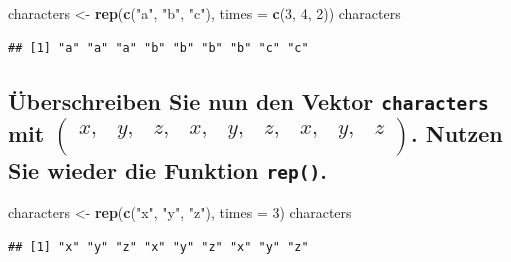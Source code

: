 \documentclass[12pt,a4paper]{article}
\newenvironment{Shaded}{\begin{snugshade}}{\end{snugshade}}
\newcommand{\AttributeTok}[1]{\textcolor[rgb]{0.13,0.29,0.53}{#1}}
\newcommand{\DecValTok}[1]{\textcolor[rgb]{0.00,0.00,0.81}{#1}}
\newcommand{\FunctionTok}[1]{\textcolor[rgb]{0.13,0.29,0.53}{\textbf{#1}}}
\newcommand{\NormalTok}[1]{#1}
\newcommand{\OtherTok}[1]{\textcolor[rgb]{0.56,0.35,0.01}{#1}}
\newcommand{\StringTok}[1]{\textcolor[rgb]{0.31,0.60,0.02}{#1}}
\begin{document}
\begin{Shaded}
\begin{Highlighting}[]
\NormalTok{    characters }\OtherTok{\textless{}{-}} \FunctionTok{rep}\NormalTok{(}\FunctionTok{c}\NormalTok{(}\StringTok{"a"}\NormalTok{, }\StringTok{"b"}\NormalTok{, }\StringTok{"c"}\NormalTok{), }\AttributeTok{times =} \FunctionTok{c}\NormalTok{(}\DecValTok{3}\NormalTok{, }\DecValTok{4}\NormalTok{, }\DecValTok{2}\NormalTok{))}
\NormalTok{    characters}
\end{Highlighting}
\end{Shaded}

\begin{verbatim}
## [1] "a" "a" "a" "b" "b" "b" "b" "c" "c"
\end{verbatim}

\vspace{0.5cm}

\subsection{\texorpdfstring{Überschreiben Sie nun den Vektor
\texttt{characters} mit
\linebreak  \(\begin{pmatrix} x, & y, & z, & x, & y, & z, & x, & y, & z \\ \end{pmatrix}\).
Nutzen Sie wieder die Funktion
\texttt{rep()}.}{Überschreiben Sie nun den Vektor  mit \textbackslash begin\{pmatrix\} x, \& y, \& z, \& x, \& y, \& z, \& x, \& y, \& z \textbackslash\textbackslash{} \textbackslash end\{pmatrix\}. Nutzen Sie wieder die Funktion .}}\label{uxfcberschreiben-sie-nun-den-vektor-mit-beginpmatrix-x-y-z-x-y-z-x-y-z-endpmatrix.-nutzen-sie-wieder-die-funktion-.}

\begin{Shaded}
\begin{Highlighting}[]
\NormalTok{    characters }\OtherTok{\textless{}{-}} \FunctionTok{rep}\NormalTok{(}\FunctionTok{c}\NormalTok{(}\StringTok{"x"}\NormalTok{, }\StringTok{"y"}\NormalTok{, }\StringTok{"z"}\NormalTok{), }\AttributeTok{times =} \DecValTok{3}\NormalTok{)}
\NormalTok{    characters}
\end{Highlighting}
\end{Shaded}

\begin{verbatim}
## [1] "x" "y" "z" "x" "y" "z" "x" "y" "z"
\end{verbatim}

\vspace{0.5cm}
\end{document}
